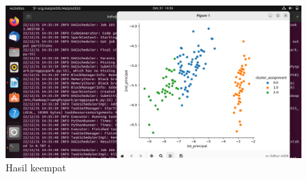 \begin{enumerate}
\begin{figure}[!ht]
\includegraphics[width=\textwidth]{TugasKelompok/Kelompok1/hasil4}
\caption{Hasil keempat}
\label{gam:hasil4}
\end{figure}

\end{enumerate}